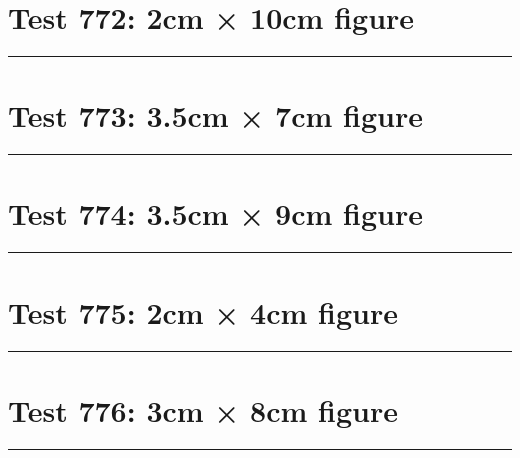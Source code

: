 \documentclass[a4paper,11pt]{article}
\begin{document}
\section*{Test 772: 2cm × 10cm figure}
\begin{swarmwrap}%
  \begin{minipage}[t]{2cm}
    \centering
    \rule{\linewidth}{10cm}
  \end{minipage}%
\end{swarmwrap}%
\swarmwrapnext
\lipsum[44]
\lipsum[45]
\lipsum[46]
\section*{Test 773: 3.5cm × 7cm figure}
\begin{swarmwrap}%
  \begin{minipage}[t]{3cm}
    \centering
    \rule{\linewidth}{7cm}
  \end{minipage}%
\end{swarmwrap}%
\swarmwrapnext
\lipsum[40]
\lipsum[41]
\lipsum[42]
\lipsum[43]
\section*{Test 774: 3.5cm × 9cm figure}
\begin{swarmwrap}%
  \begin{minipage}[t]{3cm}
    \centering
    \rule{\linewidth}{9cm}
  \end{minipage}%
\end{swarmwrap}%
\swarmwrapnext
\lipsum[24]
\lipsum[25]
\lipsum[26]
\lipsum[27]
\section*{Test 775: 2cm × 4cm figure}
\begin{swarmwrap}%
  \begin{minipage}[t]{2cm}
    \centering
    \rule{\linewidth}{4cm}
  \end{minipage}%
\end{swarmwrap}%
\swarmwrapnext
\lipsum[100]
\lipsum[101]
\lipsum[102]
\section*{Test 776: 3cm × 8cm figure}
\begin{swarmwrap}%
  \begin{minipage}[t]{3cm}
    \centering
    \rule{\linewidth}{8cm}
  \end{minipage}%
\end{swarmwrap}%
\swarmwrapnext
\lipsum[37]
\lipsum[38]
\lipsum[39]
\lipsum[40]
\lipsum[41]
\end{document}
